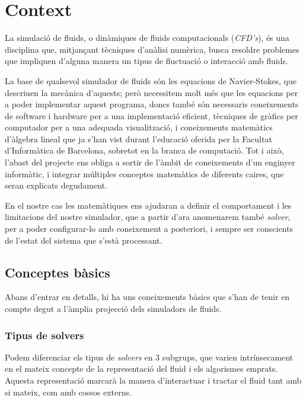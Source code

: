 \documentclass[a4paper]{report}
\begin{document}
	\section{Context}
	La simulació de fluids, o dinàmiques de fluids computacionals (\textit{CFD's}), és una disciplina que, mitjançant tècniques d'anàlisi numèrica, busca resoldre problemes que impliquen d'alguna manera un tipus de fluctuació o interacció amb fluids. \par
	La base de qualsevol simulador de fluids són les equacions de Navier-Stokes, que descriuen la mecànica d'aquests; però necessitem molt més que les equacions per a poder implementar aquest programa, doncs també són necessaris coneixements de software i hardware per a una implementació eficient, tècniques de gràfics per computador per a una adequada visualització, i coneixements matemàtics d'àlgebra lineal que ja s'han vist durant l'educació oferida per la Facultat d'Informàtica de Barcelona, sobretot en la branca de computació. Tot i això, l'abast del projecte ens obliga a sortir de l'àmbit de coneixements d'un enginyer informàtic, i integrar múltiples conceptes matemàtics de diferents caires, que seran explicats degudament. \par
	En el nostre cas les matemàtiques ens ajudaran a definir el comportament i les limitacions del nostre simulador, que a partir d'ara anomenarem també \textit{solver}, per a poder configurar-lo amb coneixement a posteriori, i sempre ser conscients de l'estat del sistema que s'està processant. 
	
	\subsection{Conceptes bàsics}
	Abans d'entrar en detalls, hi ha uns coneixements bàsics que s'han de tenir en compte degut a l'àmplia projecció dels simuladors de fluids.
	\subsubsection[Tipus de solvers]{Tipus de solvers}
	Podem diferenciar els tipus de \textit{solvers} en 3 subgrups, que varien intrínsecament en el mateix concepte de la representació del fluid i els algorismes emprats. Aquesta representació marcarà la manera d'interactuar i tractar el fluid tant amb si mateix, com amb cossos externs.
	
\end{document}
